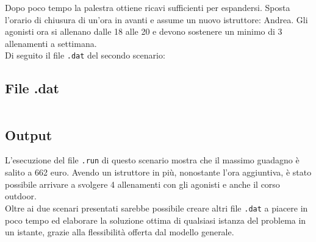 Dopo poco tempo la palestra ottiene ricavi sufficienti per espandersi. Sposta l'orario di chiusura di un'ora in avanti e assume un nuovo istruttore: Andrea. Gli agonisti ora si allenano dalle 18 alle 20 e devono sostenere un minimo di 3 allenamenti a settimana. \\
Di seguito il file \texttt{.dat} del secondo scenario:

\subsection{File .dat}
\inputminted[bgcolor=bg, breaklines, fontsize=\small]{haskell}{opl/scenario-2.dat}

\subsection{Output}
L'esecuzione del file \texttt{.run} di questo scenario mostra che il massimo guadagno è salito a 662 euro. Avendo un istruttore in più, nonostante l'ora aggiuntiva, è stato possibile arrivare a svolgere 4 allenamenti con gli agonisti e anche il corso outdoor. \\
Oltre ai due scenari presentati sarebbe possibile creare altri file \texttt{.dat} a piacere in poco tempo ed elaborare la soluzione ottima di qualsiasi istanza del problema in un istante, grazie alla flessibilità offerta dal modello generale.
